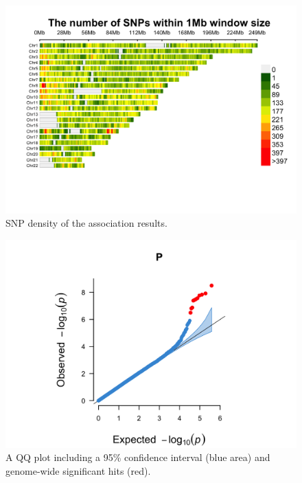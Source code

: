 \documentclass[
]{book}
\begin{document}
\begin{figure}[H]

{\centering \includegraphics[width=0.85\linewidth]{img/_gwas_wtccc/WTCCC1ResultsManhattan-density} 

}

\caption{SNP density of the association results.}\label{fig:show-wtccc1-graphs-density}
\end{figure}

\begin{figure}[H]

{\centering \includegraphics[width=0.85\linewidth]{img/_gwas_wtccc/WTCCC1ResultsManhattan-qq} 

}

\caption{A QQ plot including a 95\% confidence interval (blue area) and genome-wide significant hits (red).}\label{fig:show-wtccc1-graphs-qq}
\end{figure}
\end{document}
